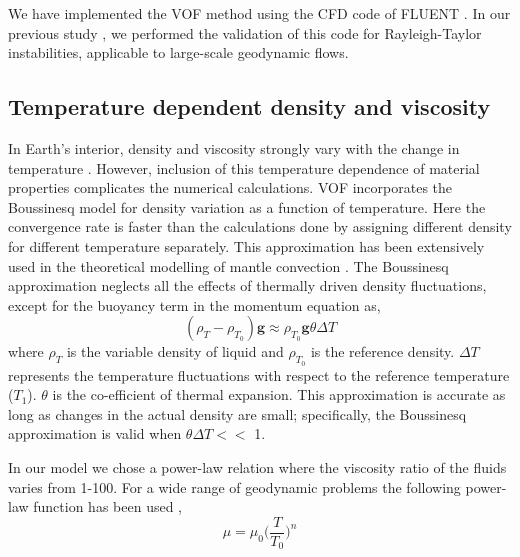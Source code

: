 \documentclass[12pt]{article}
\begin{document}
We have implemented the VOF method using the CFD code of FLUENT \cite{fluent, gopala2008volume}. In our previous study \cite{dutta2016role}, we performed the validation of this code for Rayleigh-Taylor instabilities, applicable to large-scale geodynamic flows.




\subsection{Temperature dependent density and viscosity}
\label{sec:temp_dep} 

In Earth's interior, density and viscosity strongly vary with the change in temperature \cite{ranalli1995rheology}. However, inclusion of this temperature dependence of material properties complicates the numerical calculations. VOF incorporates the Boussinesq model for density variation as a function of temperature. Here the convergence rate is faster than the calculations done by assigning different density for different temperature separately.  This approximation has been extensively used in the theoretical modelling of mantle convection 
\cite{schubert2001mantle}. The Boussinesq approximation neglects all the effects of thermally driven density fluctuations, except for the buoyancy term in the momentum equation as,  
\begin{equation}
(\rho_{T} - \rho_{T_0})\pmb{g} \approx  \rho_{T_0} \pmb{g} \theta \Delta T 
\label{eqn:dens1}
\end{equation}
where $\rho_{T}$ is the variable density of liquid and $\rho_{T_0}$ is 
the reference density. $\Delta T $ represents the temperature fluctuations with respect to the reference temperature ($T_1$). $\theta$ is the co-efficient of thermal expansion. This approximation is accurate as long as changes in the actual density are small; specifically, the Boussinesq approximation 
is valid when $\theta \Delta T <<$  1.



In our model we chose a power-law relation where the viscosity ratio of the fluids varies from 1-100. For a wide range of geodynamic problems the following power-law function has been used \cite{turcotte2014geodynamics, sarkar2014role}, 
\begin{equation}
\mu = \mu_0 \Big(\frac {T}{T_0}\Big)^n
\label{eqn:vis_power}
\end{equation}
\end{document}
